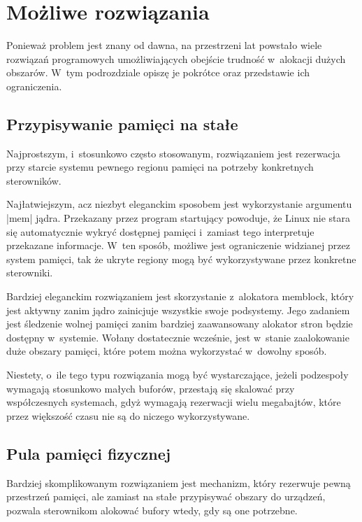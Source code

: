 \section{Możliwe rozwiązania}

Ponieważ problem jest znany od dawna, na przestrzeni lat powstało
wiele rozwiązań programowych umożliwiających obejście trudność
w~alokacji dużych obszarów.  W~tym podrozdziale opiszę je pokrótce
oraz przedstawie ich ograniczenia.

\subsection{Przypisywanie pamięci na stałe}

Najprostszym, i~stosunkowo często stosowanym, rozwiązaniem jest
rezerwacja przy starcie systemu pewnego regionu pamięci na potrzeby
konkretnych sterowników.

Najłatwiejszym, acz niezbyt eleganckim sposobem jest wykorzystanie
argumentu \code|mem| jądra.  Przekazany przez program startujący
powoduje, że Linux nie stara się automatycznie wykryć dostępnej
pamięci  i~zamiast tego interpretuje przekazane informacje.  W~ten
sposób, możliwe jest ograniczenie widzianej przez system pamięci, tak
że ukryte regiony mogą być wykorzystywane przez konkretne sterowniki.

Bardziej eleganckim rozwiązaniem jest skorzystanie z~alokatora
memblock, który jest aktywny zanim jądro zainicjuje wszystkie swoje
podsystemy.  Jego zadaniem jest śledzenie wolnej pamięci zanim
bardziej zaawansowany alokator stron będzie dostępny w~systemie.
Wołany dostatecznie wcześnie, jest w~stanie zaalokowanie duże obszary
pamięci, które potem można wykorzystać w~dowolny sposób.

Niestety, o~ile tego typu rozwiązania mogą być wystarczające, jeżeli
podzespoły wymagają stosunkowo małych buforów, przestają się skalować
przy współczesnych systemach, gdyż wymagają rezerwacji wielu
megabajtów, które przez większość czasu nie są do niczego
wykorzystywane.

\subsection{Pula pamięci fizycznej}

Bardziej skomplikowanym rozwiązaniem jest mechanizm, który rezerwuje
pewną przestrzeń pamięci, ale zamiast na stałe przypisywać obszary do
urządzeń, pozwala sterownikom alokować bufory wtedy, gdy są one
potrzebne.

